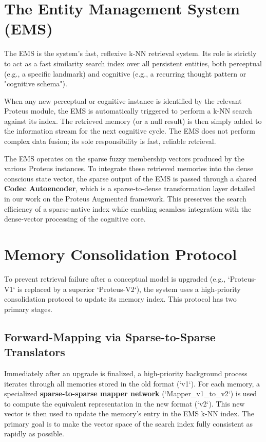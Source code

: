 \documentclass{article}
\begin{document}
\section{The Entity Management System (EMS)}

The EMS is the system's fast, reflexive k-NN retrieval system. Its role is strictly to act as a fast similarity search index over all persistent entities, both perceptual (e.g., a specific landmark) and cognitive (e.g., a recurring thought pattern or "cognitive schema").

When any new perceptual or cognitive instance is identified by the relevant Proteus module, the EMS is automatically triggered to perform a k-NN search against its index. The retrieved memory (or a null result) is then simply added to the information stream for the next cognitive cycle. The EMS does not perform complex data fusion; its sole responsibility is fast, reliable retrieval.

The EMS operates on the sparse fuzzy membership vectors produced by the various Proteus instances. To integrate these retrieved memories into the dense conscious state vector, the sparse output of the EMS is passed through a shared \textbf{Codec Autoencoder}, which is a sparse-to-dense transformation layer detailed in our work on the Proteus Augmented framework. This preserves the search efficiency of a sparse-native index while enabling seamless integration with the dense-vector processing of the cognitive core.

\section{Memory Consolidation Protocol}

To prevent retrieval failure after a conceptual model is upgraded (e.g., `Proteus-V1` is replaced by a superior `Proteus-V2`), the system uses a high-priority consolidation protocol to update its memory index. This protocol has two primary stages.

\subsection{Forward-Mapping via Sparse-to-Sparse Translators}
Immediately after an upgrade is finalized, a high-priority background process iterates through all memories stored in the old format (`v1`). For each memory, a specialized \textbf{sparse-to-sparse mapper network} (`Mapper_v1_to_v2`) is used to compute the equivalent representation in the new format (`v2`). This new vector is then used to update the memory's entry in the EMS k-NN index. The primary goal is to make the vector space of the search index fully consistent as rapidly as possible.
\end{document}

